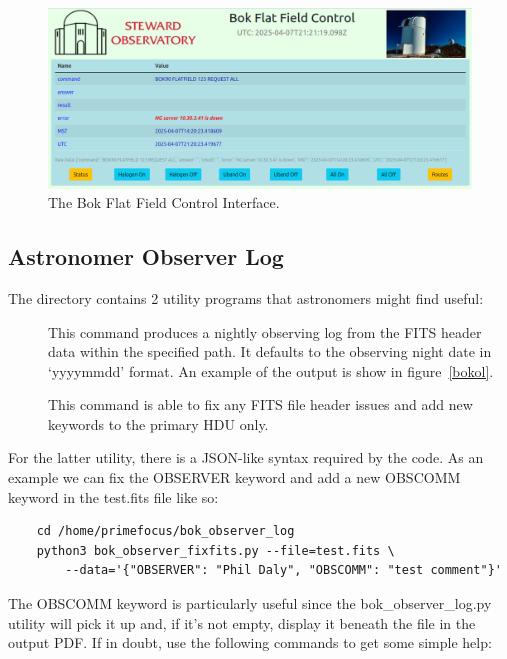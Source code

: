 \documentclass[12pt,twoside]{article}
\begin{document}
\begin{figure}[!h]
 \centering
 \includegraphics[width=0.8\linewidth]{bokFlatField.png}
 \caption{The Bok Flat Field Control Interface.}
 \label{bokff}
\end{figure}

\subsection{Astronomer Observer Log}
\label{astronomerobserverlog}

The directory  contains 2 utility programs that astronomers might find useful:

\begin{description}
 \item[] This command produces a nightly observing log from the FITS header data within the specified path. It defaults to the observing night date in `yyyymmdd' format. An example of the output is show in figure~\ref{bokol}.
 \item[] This command is able to fix any FITS file header issues and add new keywords to the primary HDU only.
\end{description}

For the latter utility, there is a JSON-like syntax required by the code. As an example we can fix the OBSERVER keyword and add a new OBSCOMM keyword in the test.fits file like so:

\begin{verbatim}
    cd /home/primefocus/bok_observer_log
    python3 bok_observer_fixfits.py --file=test.fits \
        --data='{"OBSERVER": "Phil Daly", "OBSCOMM": "test comment"}'
\end{verbatim}

The OBSCOMM keyword is particularly useful since the bok\_observer\_log.py utility will pick it up and, if it's not 
empty, display it beneath the file in the output PDF. If in doubt, use the following commands to get some simple help:
\end{document}
